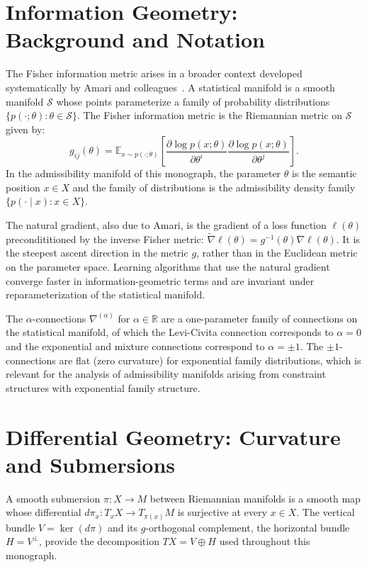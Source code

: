 \documentclass[12pt, oneside]{book}
\theoremstyle{plain-flyxion}
\theoremstyle{definition-flyxion}
\begin{document}
\chapter{Information Geometry: Background and Notation}

The Fisher information metric arises in a broader context developed systematically by
Amari and colleagues~\cite{amari2016information}. A statistical manifold is a smooth
manifold $\mathcal{S}$ whose points parameterize a family of probability distributions
$\{p(\cdot;\theta): \theta\in\mathcal{S}\}$. The Fisher information metric is the
Riemannian metric on $\mathcal{S}$ given by:
\[
g_{ij}(\theta) = \mathbb{E}_{x\sim p(\cdot;\theta)}\!\left[
  \frac{\partial\log p(x;\theta)}{\partial\theta^i}
  \frac{\partial\log p(x;\theta)}{\partial\theta^j}
\right].
\]
In the admissibility manifold of this monograph, the parameter $\theta$ is the semantic
position $x\in X$ and the family of distributions is the admissibility density family
$\{p(\cdot\mid x): x\in X\}$.

The natural gradient, also due to Amari, is the gradient of a loss function $\ell(\theta)$
precondititioned by the inverse Fisher metric: $\tilde\nabla\ell(\theta) = g^{-1}(\theta)
\nabla\ell(\theta)$. It is the steepest ascent direction in the metric $g$, rather than
in the Euclidean metric on the parameter space. Learning algorithms that use the natural
gradient converge faster in information-geometric terms and are invariant under
reparameterization of the statistical manifold.

The $\alpha$-connections $\nabla^{(\alpha)}$ for $\alpha\in\mathbb{R}$ are a one-parameter
family of connections on the statistical manifold, of which the Levi-Civita connection
corresponds to $\alpha=0$ and the exponential and mixture connections correspond to
$\alpha=\pm 1$. The $\pm 1$-connections are flat (zero curvature) for exponential family
distributions, which is relevant for the analysis of admissibility manifolds arising from
constraint structures with exponential family structure.

\chapter{Differential Geometry: Curvature and Submersions}

A smooth submersion $\pi: X\to M$ between Riemannian manifolds is a smooth map whose
differential $d\pi_x: T_xX\to T_{\pi(x)}M$ is surjective at every $x\in X$. The
vertical bundle $V = \ker(d\pi)$ and its $g$-orthogonal complement, the horizontal bundle
$H = V^\perp$, provide the decomposition $TX = V\oplus H$ used throughout this monograph.
\end{document}
